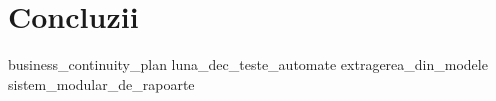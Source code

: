 \chapter*{Concluzii}
{business_continuity_plan}
{luna_dec_teste_automate}
{extragerea_din_modele}
{sistem_modular_de_rapoarte}
